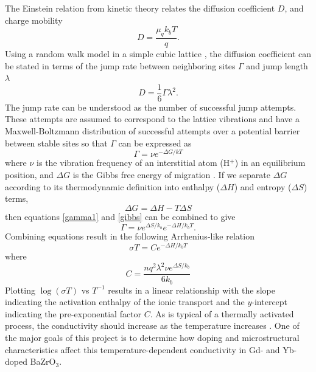 The Einstein relation from kinetic theory relates the diffusion coefficient $D$, and charge mobility
\begin{equation}
 D = \dfrac{\mu_q k_b T}{q}.
 \label{eq:back:diffusion:nernsteinstein}
 \end{equation} 
Using a random walk model in a simple cubic lattice \cite{Mehrer2007}, the diffusion coefficient can be stated in terms of the jump rate between neighboring sites $\varGamma$ and jump length $\lambda$
\begin{equation}
D = \dfrac{1}{6}\varGamma \lambda^2.
\end{equation}
The jump rate can be understood as the number of successful jump attempts. These attempts are assumed to correspond to the lattice vibrations and have a Maxwell-Boltzmann distribution of successful attempts over a potential barrier between stable sites so that $\varGamma$ can be expressed as 
\begin{equation}
\varGamma=\nu e^{-\Delta G/k T}
\label{gamma1}
\end{equation}
where $\nu$ is the vibration frequency  of an interstitial atom (H$^+$) in an equilibrium position, and $\Delta G$ is the Gibbs free energy of migration \cite{Tilley2008}. If we separate $\Delta G$ according to its thermodynamic definition into enthalpy ($\Delta H$) and entropy ($\Delta S$) terms,
\begin{equation}
\Delta G=\Delta H - T \Delta S
\label{gibbs}
\end{equation}
then equations \ref{gamma1} and \ref{gibbs} can be combined to give
\begin{equation}
\varGamma = \nu e^{\Delta S/k_b}e^{-\Delta H/k_b T}.
\end{equation}
Combining equations  result in the following Arrhenius-like relation
\begin{equation}
\sigma T = C e^{-\Delta H/k_b T}
\label{arrhenius}
\end{equation}
where
\begin{equation}
C = \dfrac{n q^2 \lambda^2 \nu e^{\Delta S/k_b}}{6 k_b}  
\end{equation}
Plotting $\log(\sigma T)$ vs $T^{-1}$ results in a linear relationship with the slope indicating the activation enthalpy of the ionic transport and the $y$-intercept indicating the pre-exponential factor $C$. As is typical of a thermally activated process, the conductivity should increase as the temperature increases \cite{Babilo2007b}. One of the major goals of this project is to determine how doping and microstructural characteristics affect this temperature-dependent conductivity in Gd- and Yb-doped BaZrO$_3$.